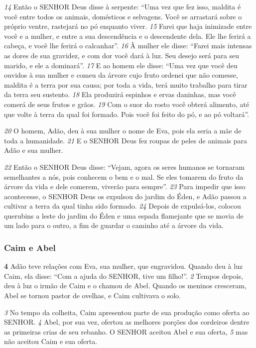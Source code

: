 \bigskip
\textit{\tiny 14}
Então o SENHOR Deus disse à serpente:
  “Uma vez que fez isso, maldita é você
     entre todos os animais, domésticos e selvagens.
  Você se arrastará sobre o próprio ventre,
     rastejará no pó enquanto viver.
\textit{\tiny 15}
Farei que haja inimizade entre você e a mulher,
     e entre a sua descendência e o descendente dela.
  Ele lhe ferirá a cabeça,
     e você lhe ferirá o calcanhar”.
\textit{\tiny 16}
À mulher ele disse:
  “Farei mais intensas as dores de sua gravidez,
    e com dor você dará à luz.
  Seu desejo será para seu marido,
    e ele a dominará”.
\textit{\tiny 17}
E ao homem ele disse:
  “Uma vez que você deu ouvidos à sua mulher
    e comeu da árvore cujo fruto ordenei que não comesse,
  maldita é a terra por sua causa;
    por toda a vida, terá muito trabalho para tirar da terra seu sustento.
\textit{\tiny 18}
Ela produzirá espinhos e ervas daninhas,
    mas você comerá de seus frutos e grãos.
\textit{\tiny 19}
Com o suor do rosto você obterá alimento,
    até que volte à terra da qual foi formado.
  Pois você foi feito do pó,
    e ao pó voltará”.

\bigskip
\textit{\tiny 20}
O homem, Adão, deu à sua mulher o nome de Eva, pois ela seria a mãe de toda
a humanidade.  
\textit{\tiny 21}
E o SENHOR Deus fez roupas de peles de animais para Adão e sua
mulher.

\bigskip
\textit{\tiny 22}
Então o SENHOR Deus disse: “Vejam, agora os seres humanos se tornaram
semelhantes a nós, pois conhecem o bem e o mal. Se eles tomarem do fruto da
árvore da vida e dele comerem, viverão para sempre”.  
\textit{\tiny 23}
Para impedir que isso
acontecesse, o SENHOR Deus os expulsou do jardim do Éden, e Adão passou a
cultivar a terra da qual tinha sido formado.  
\textit{\tiny 24}
Depois de expulsá-los, colocou
querubins a leste do jardim do Éden e uma espada flamejante que se movia de um
lado para o outro, a fim de guardar o caminho até a árvore da vida.

\bigskip
\subsubsection*{Caim e Abel}
\textbf{\large 4} 
Adão teve relações com Eva, sua mulher, que engravidou. Quando deu à luz
Caim, ela disse: “Com a ajuda do SENHOR, tive um filho!”. 
\textit{\tiny 2}
Tempos depois, deu à
luz o irmão de Caim e o chamou de Abel.
   Quando os meninos cresceram, Abel se tornou pastor de ovelhas, e Caim
cultivava o solo. 

\bigskip
\textit{\tiny 3}
No tempo da colheita, Caim apresentou parte de sua produção
como oferta ao SENHOR. 
\textit{\tiny 4}
Abel, por sua vez, ofertou as melhores porções dos
cordeiros dentre as primeiras crias de seu rebanho. O SENHOR aceitou Abel e sua
oferta, 
\textit{\tiny 5}
mas não aceitou Caim e sua oferta. 

